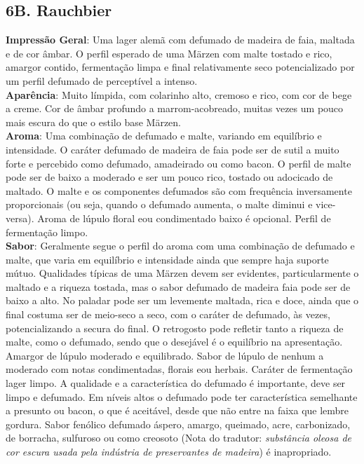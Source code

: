 \subsection*{6B. Rauchbier}
\textbf{Impressão Geral}: Uma lager alemã com defumado de madeira de faia, maltada e de cor âmbar. O perfil esperado de uma Märzen com malte tostado e rico, amargor contido, fermentação limpa e final relativamente seco potencializado por um perfil defumado de perceptível a intenso. \\
\textbf{Aparência}: Muito límpida, com colarinho alto, cremoso e rico, com cor de bege a creme. Cor de âmbar profundo a marrom-acobreado, muitas vezes um pouco mais escura do que o estilo base Märzen. \\
\textbf{Aroma}: Uma combinação de defumado e malte, variando em equilíbrio e intensidade. O caráter defumado de madeira de faia pode ser de sutil a muito forte e percebido como defumado, amadeirado ou como bacon. O perfil de malte pode ser de baixo a moderado e ser um pouco rico, tostado ou adocicado de maltado. O malte e os componentes defumados são com frequência inversamente proporcionais (ou seja, quando o defumado aumenta, o malte diminui e vice-versa). Aroma de lúpulo floral e\/ou condimentado baixo é opcional. Perfil de fermentação limpo. \\
\textbf{Sabor}: Geralmente segue o perfil do aroma com uma combinação de defumado e malte, que varia em equilíbrio e intensidade ainda que sempre haja suporte mútuo. Qualidades típicas de uma Märzen devem ser evidentes, particularmente o maltado e a riqueza tostada, mas o sabor defumado de madeira faia pode ser de baixo a alto. No paladar pode ser um levemente maltada, rica e doce, ainda que o final costuma ser de meio-seco a seco, com o caráter de defumado, às vezes, potencializando a secura do final. O retrogosto pode refletir tanto a riqueza de malte, como o defumado, sendo que o desejável é o equilíbrio na apresentação. Amargor de lúpulo moderado e equilibrado. Sabor de lúpulo de nenhum a moderado com notas condimentadas, florais e\/ou herbais. Caráter de fermentação lager limpo. A qualidade e a característica do defumado é importante, deve ser limpo e defumado. Em níveis altos o defumado pode ter característica semelhante a presunto ou bacon, o que é aceitável, desde que não entre na faixa que lembre gordura. Sabor fenólico defumado áspero, amargo, queimado, acre, carbonizado, de borracha, sulfuroso ou como creosoto (Nota do tradutor: \textit{substância oleosa de cor escura usada pela indústria de preservantes de madeira}) é inapropriado. \\
